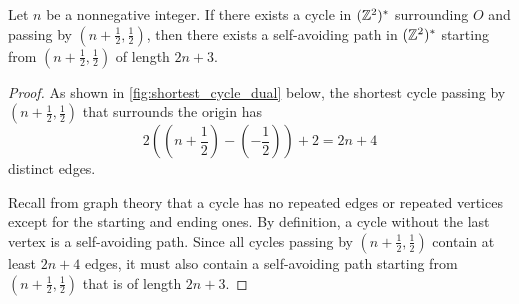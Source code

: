 \documentclass[a4paper, 12pt]{article}
\begin{document}
\begin{prop}\label{prop:cylce_implies_path}
Let $n$ be a nonnegative integer. If there exists a cycle in $(\mathbb{Z}^2)^*$ surrounding $O$ and passing by $(n + \frac{1}{2}, \frac{1}{2})$, then there exists a self-avoiding path in $(\mathbb{Z}^2)^*$ starting from $(n + \frac{1}{2}, \frac{1}{2})$ of length $2n + 3$.
\end{prop}
\begin{proof}
As shown in \cref{fig:shortest_cycle_dual} below, the shortest cycle passing by $(n + \frac{1}{2}, \frac{1}{2})$ that surrounds the origin has \[2\left((n + \frac{1}{2}) - (-\frac{1}{2})\right) + 2 = 2n + 4\] distinct edges.


Recall from graph theory that a cycle has no repeated edges or repeated vertices except for the starting and ending ones. By definition, a cycle without the last vertex is a self-avoiding path. Since all cycles passing by $(n + \frac{1}{2}, \frac{1}{2})$ contain at least $2n + 4$ edges, it must also contain a self-avoiding path starting from $(n + \frac{1}{2}, \frac{1}{2})$ that is of length $2n + 3$.
\end{proof}
\end{document}
